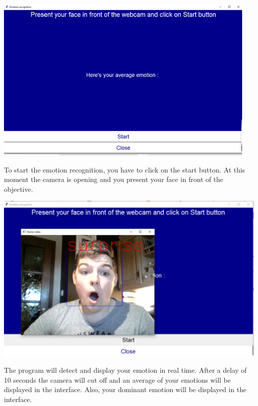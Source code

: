 \documentclass[a4paper, 10pt, conference]{ieeeconf}      %
\begin{document}
\begin{center}
\includegraphics[scale=0.7]{Interface}
\label{fig4}
\end{center}

To start the emotion recognition, you have to click on the start button. At this moment the camera is opening and you present your face in front of the objective.

\begin{center}
\includegraphics[scale=0.7]{Interface1}
\label{fig5}
\end{center}

The program will detect and display your emotion in real time.
After a delay of 10 seconds the camera will cut off and an average of your emotions will be displayed in the interface.
Also, your dominant emotion will be displayed in the interface.
\end{document}
